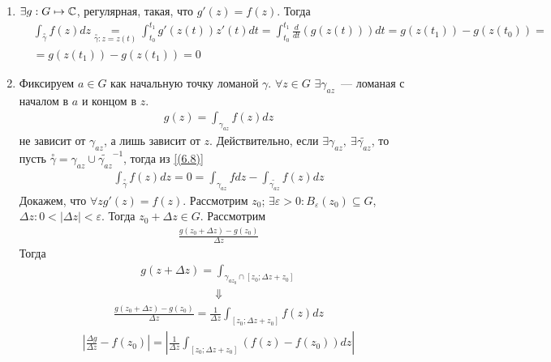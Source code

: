 \begin{enumerate}
    \item $\exists g:G \mapsto \mathbb{C}$, регулярная, такая, что $g'(z) = f(z)$.
    Тогда
    \begin{align*}
      & \int_{\overset{\circ}{\gamma}} f(z) dz \underset{\overset{\circ}{\gamma}: z = z(t)}{=} \int_{t_0}^{t_1} g'(z(t))z'(t)dt = \int_{t_0}^{t_1}\frac{d}{dt}(g(z(t)))dt = g(z(t_1)) - g(z(t_0)) = \\
      & = g(z(t_1)) - g(z(t_1)) = 0
    \end{align*}
    \item Фиксируем $a \in G$ как начальную точку ломаной $\gamma$. $\forall z
    \in G$ $\exists \gamma_{az}$~--- ломаная с началом в $a$ и концом в $z$.
    \begin{align*}
      & g(z) = \int_{\gamma_{az}} f(z) dz
    \end{align*}
    не зависит от $\gamma_{az}$, а лишь зависит от $z$. Действительно, если
    $\exists \gamma_{az}, \ \exists \tilde{\gamma_{az}}$, то пусть
    $\overset{\circ}{\gamma} = \gamma_{az} \cup \tilde{\gamma_{az}}^{-1}$,
    тогда из \eqref{(6.8)}
    \begin{align*}
      & \int_{\overset{\circ}{\gamma}} f(z) dz = 0 = \int_{\gamma_{az}}f dz - \int_{\tilde{\gamma_{az}}}f(z)dz
    \end{align*}
    Докажем, что $\forall z g'(z) = f(z)$. Рассмотрим $z_0$; $\exists
    \varepsilon > 0: B_{\varepsilon}(z_0) \subseteq G$, $\Delta z: 0 <
    \left| \Delta z \right| < \varepsilon$. Тогда $z_0 + \Delta z \in G$.
    Рассмотрим
    \begin{align*}
      & \frac{g(z_0+\Delta z) - g(z_0)}{\Delta z}
    \end{align*}
    Тогда
    \begin{align*}
      & g(z+ \Delta z) = \int_{\gamma_{az_0} \cap [z_0; \Delta z + z_0]}
    \end{align*}
    \begin{align*}
      & \Downarrow
    \end{align*}
    \begin{align*}
      & \frac{g(z_0+ \Delta z) - g(z_0)}{\Delta z} = \frac{1}{\Delta z} \int_{[z_0; \Delta z + z_0]} f(z)dz
    \end{align*}
    \begin{align*}
      & \left| \frac{\Delta g}{\Delta z} - f(z_0) \right| = \left| \frac{1}{\Delta z} \int_{[z_0; \Delta z + z_0]}(f(z) - f(z_0))dz \right|
    \end{align*}    
\end{enumerate}
